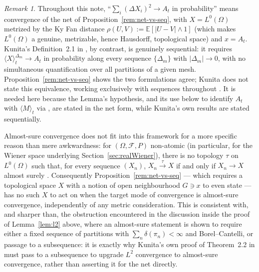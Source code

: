 \documentclass[11pt,fleqn]{article}
\def\E{\mathbb E}
\theoremstyle{plain}
\theoremstyle{remark}
\newtheorem{remark}[thm]{Remark}
\begin{document}
\begin{remark}
Throughout this note, ``$\sum_i(\Delta X_i)^2\to A_t$ in probability''
means convergence of the net of
Proposition~\ref{rem:net-vs-seq}, with $X=L^0(\Omega)$ metrized by the Ky
Fan distance $\rho(U,V):=\E[|U-V|\wedge1]$ (which makes $L^0(\Omega)$ a
genuine, metrizable, hence Hausdorff, topological space) and $x=A_t$.
Kunita's Definition~2.1 in \cite{Kunita82}, by contrast, is genuinely
sequential: it requires $\langle X\rangle_t^{\Delta_m}\to A_t$ in
probability along every sequence $\{\Delta_m\}$ with $|\Delta_m|\to0$,
with no simultaneous quantification over all partitions of a given mesh.
Proposition~\ref{rem:net-vs-seq} shows the two formulations agree; Kunita
does not state this equivalence, working exclusively with sequences
throughout \cite{Kunita82}. It is needed here because the Lemma's
hypothesis, and its use below to identify $A_t$ with $\langle
M\rangle_t$ via \cite{Kunita82}, are stated in the net form, while
Kunita's own results are stated sequentially.

Almost-sure convergence does not fit into this framework for a more
specific reason than mere awkwardness: for $(\Omega,\mathcal F,P)$
non-atomic (in particular, for the Wiener space underlying
Section~\ref{sec:realWiener}), there is no topology $\tau$ on
$L^0(\Omega)$ such that, for every sequence $(X_n)$,
$X_n\xrightarrow{\tau}X$ if and only if $X_n\to X$ almost surely
\cite{Ordman66}. Consequently Proposition~\ref{rem:net-vs-seq} --- which
requires a topological space $X$ with a notion of open neighbourhood
$G\ni x$ to even state --- has no such $X$ to act on when the target mode
of convergence is almost-sure convergence, independently of any metric
consideration. This is consistent with, and sharper than, the
obstruction encountered in the discussion inside the proof of
Lemma~\ref{lem:l2} above, where an almost-sure statement is shown to
require either a fixed sequence of partitions with
$\sum_n\delta(\pi_n)<\infty$ and Borel--Cantelli, or passage to a
subsequence: it is exactly why Kunita's own proof of Theorem~2.2 in
\cite{Kunita82} must pass to a subsequence to upgrade $L^2$ convergence to
almost-sure convergence, rather than asserting it for the net directly.


\end{remark}
\end{document}
